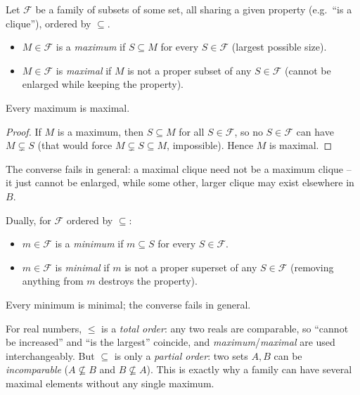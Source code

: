 \documentclass[11pt]{article}
\begin{document}
\begin{definition}
Let $\mathcal{F}$ be a family of subsets of some set, all sharing a given property (e.g.\ ``is a clique''), ordered by $\subseteq$.
\begin{itemize}
    \item $M \in \mathcal{F}$ is a \emph{maximum} if $S \subseteq M$ for every $S \in \mathcal{F}$ (largest possible size).
    \item $M \in \mathcal{F}$ is \emph{maximal} if $M$ is not a proper subset of any $S \in \mathcal{F}$ (cannot be enlarged while keeping the property).
\end{itemize}
\end{definition}

\begin{theorem}
Every maximum is maximal.
\end{theorem}
\begin{proof}
If $M$ is a maximum, then $S \subseteq M$ for all $S \in \mathcal{F}$, so no $S \in \mathcal{F}$ can have $M \subsetneq S$ (that would force $M \subsetneq S \subseteq M$, impossible). Hence $M$ is maximal.
\end{proof}

\begin{note}
The converse fails in general: a maximal clique need not be a maximum clique -- it just cannot be enlarged, while some other, larger clique may exist elsewhere in $B$.
\end{note}

\begin{definition}
Dually, for $\mathcal{F}$ ordered by $\subseteq$:
\begin{itemize}
    \item $m \in \mathcal{F}$ is a \emph{minimum} if $m \subseteq S$ for every $S \in \mathcal{F}$.
    \item $m \in \mathcal{F}$ is \emph{minimal} if $m$ is not a proper superset of any $S \in \mathcal{F}$ (removing anything from $m$ destroys the property).
\end{itemize}
Every minimum is minimal; the converse fails in general.
\end{definition}

\begin{note}
For real numbers, $\le$ is a \emph{total order}: any two reals are comparable, so ``cannot be increased'' and ``is the largest'' coincide, and \emph{maximum}/\emph{maximal} are used interchangeably. But $\subseteq$ is only a \emph{partial order}: two sets $A,B$ can be \emph{incomparable} ($A \not\subseteq B$ and $B \not\subseteq A$). This is exactly why a family can have several maximal elements without any single maximum.
\end{note}
\end{document}
